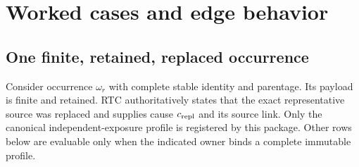 \section{Worked cases and edge behavior}
\label{sec:edge-cases}

\subsection{One finite, retained, replaced occurrence}

Consider occurrence $\omega_r$ with complete stable identity and parentage.
Its payload is finite and retained. RTC authoritatively states that the exact
representative source was replaced and supplies cause $c_{\rm repl}$ and its
source link. Only the canonical independent-exposure profile is registered by
this package. Other rows below are evaluable only when the indicated owner
binds a complete immutable profile.

